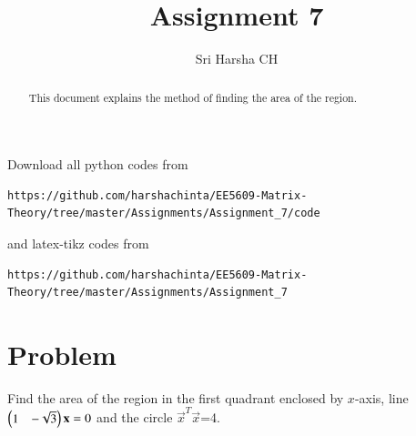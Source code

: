 \documentclass[journal,12pt,twocolumn]{IEEEtran}
\begin{document}
\renewcommand{\thefigure}{\theproblem}

\def\putbox#1#2#3{\makebox[0in][l]{\makebox[#1][l]{}\raisebox{\baselineskip}[0in][0in]{\raisebox{#2}[0in][0in]{#3}}}}
     \def\rightbox#1{\makebox[0in][r]{#1}}
     \def\centbox#1{\makebox[0in]{#1}}
     \def\topbox#1{\raisebox{-\baselineskip}[0in][0in]{#1}}
     \def\midbox#1{\raisebox{-0.5\baselineskip}[0in][0in]{#1}}
\vspace{3cm}
\title{Assignment 7}
\author{Sri Harsha CH}

\maketitle
\newpage

\bigskip
\renewcommand{\thefigure}{\theenumi}
\renewcommand{\thetable}{\theenumi}

\begin{abstract}
This document explains the method of finding the area of the region.
\end{abstract}

Download all python codes from 
\begin{lstlisting}
https://github.com/harshachinta/EE5609-Matrix-Theory/tree/master/Assignments/Assignment_7/code
\end{lstlisting}
%
and latex-tikz codes from 
%
\begin{lstlisting}
https://github.com/harshachinta/EE5609-Matrix-Theory/tree/master/Assignments/Assignment_7
\end{lstlisting}
%
\section{Problem}
Find the area of the region in the first quadrant enclosed by $x$-axis, line $\begin{pmatrix}1&-\sqrt{3}\end{pmatrix}\mathbf{x}=0$ and the circle $\vec{x}^{T}\vec{x}$=4.
\end{document}
